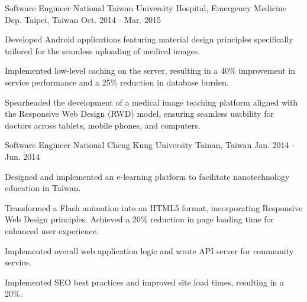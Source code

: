 \begin{cventries}
  \cventry
    {Software Engineer} %
    {National Taiwan University Hospital, Emergency Medicine Dep.} %
    {Taipei, Taiwan} %
    {Oct. 2014 - Mar. 2015} %
    {
      \begin{cvitems} %
        \item {Developed Android applications featuring material design principles specifically tailored for the seamless uploading of medical images.}
        \item {Implemented low-level caching on the server, resulting in a 40\% improvement in service performance and a 25\% reduction in database burden.}
        \item {Spearheaded the development of a medical image teaching platform aligned with the Responsive Web Design (RWD) model, ensuring seamless usability for doctors across tablets, mobile phones, and computers.}
      \end{cvitems}
    }

  \cventry
    {Software Engineer} %
    {National Cheng Kung University} %
    {Tainan, Taiwan} %
    {Jan. 2014 - Jun. 2014} %
    {
      \begin{cvitems} %
        \item {Designed and implemented an e-learning platform to facilitate nanotechnology education in Taiwan.}
        \item {Transformed a Flash animation into an HTML5 format, incorporating Responsive Web Design principles. Achieved a 20\% reduction in page loading time for enhanced user experience.}
        \item {Implemented overall web application logic and wrote API server for community service.}
        \item {Implemented SEO best practices and improved site load times, resulting in a 20\%. }
      \end{cvitems}
    }

\end{cventries}
